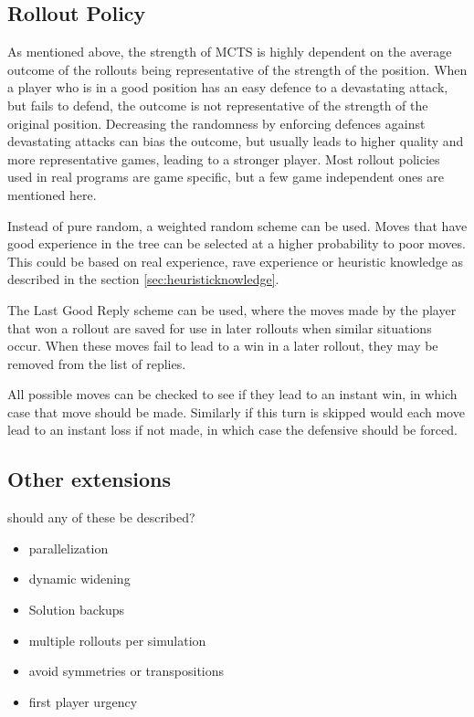 \subsection{Rollout Policy}

As mentioned above, the strength of MCTS is highly dependent on the average outcome of the rollouts being representative of the strength of the position. When a player who is in a good position has an easy defence to a devastating attack, but fails to defend, the outcome is not representative of the strength of the original position. Decreasing the randomness by enforcing defences against devastating attacks can bias the outcome, but usually leads to higher quality and more representative games, leading to a stronger player. Most rollout policies used in real programs are game specific, but a few game independent ones are mentioned here.

Instead of pure random, a weighted random scheme can be used. Moves that have good experience in the tree can be selected at a higher probability to poor moves. This could be based on real experience, rave experience or heuristic knowledge as described in the section \ref{sec:heuristicknowledge}.

The Last Good Reply scheme can be used, where the moves made by the player that won a rollout are saved for use in later rollouts when similar situations occur. When these moves fail to lead to a win in a later rollout, they may be removed from the list of replies.

All possible moves can be checked to see if they lead to an instant win, in which case that move should be made. Similarly if this turn is skipped would each move lead to an instant loss if not made, in which case the defensive should be forced.



\subsection{Other extensions}

should any of these be described?

\begin{itemize}
\item parallelization
\item dynamic widening
\item Solution backups
\item multiple rollouts per simulation
\item avoid symmetries or transpositions
\item first player urgency
\end{itemize}












